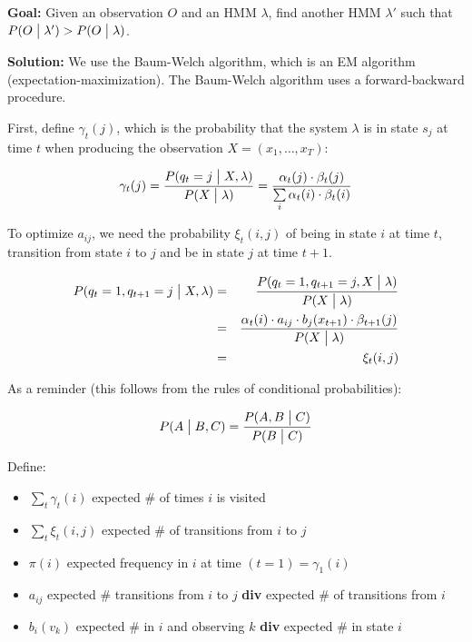 \documentclass[11pt]{article}
\begin{document}
\textbf{Goal:} Given an observation $O$ and an HMM $\lambda$, find another HMM $\lambda'$ such that $P(O \bigm| \lambda') > P(O \bigm| \lambda)$.

\textbf{Solution:} We use the Baum-Welch algorithm, which is an EM algorithm (expectation-maximization). The Baum-Welch algorithm uses a forward-backward procedure.

First, define $\gamma_t(j)$, which is the probability that the system $\lambda$ is in state $s_j$ at time $t$ when producing the observation $X = (x_1, \ldots, x_T)$:

\begin{equation}
    \gamma_t(j) = \frac{P(q_t = j \bigm| X, \lambda)}{P(X \bigm| \lambda)} = \frac{\alpha_t(j) \cdot \beta_t(j)}{\sum\limits_i \alpha_t(i) \cdot \beta_t(i)}
\end{equation}

To optimize $a_{ij}$, we need the probability $\xi_t(i, j)$ of being in state $i$ at time $t$, transition from state $i$ to $j$ and be in state $j$ at time $t+1$.

\begin{eqnarray*}
    P(q_t = 1, q_{t+1} = j \bigm| X, \lambda) &=& \frac{P(q_t = 1, q_{t+1} = j, X \bigm| \lambda)}{P(X \bigm| \lambda)} \\
                                              &=& \frac{\alpha_t(i) \cdot a_{ij} \cdot b_j(x_{t+1}) \cdot \beta_{t+1}(j)}{P(X \bigm| \lambda)} \\
                                              &=& \xi_t(i, j)
\end{eqnarray*}

As a reminder (this follows from the rules of conditional probabilities):

\begin{equation}
    P(A \bigm| B, C) = \frac{P(A, B \bigm| C)}{P(B \bigm| C)}
\end{equation}

Define:
\begin{itemize}
    \item $\sum\limits_t \gamma_t(i)$ expected \# of times $i$ is visited
    \item $\sum\limits_t \xi_t(i, j)$ expected \# of transitions from $i$ to $j$
    \item $\pi(i)$ expected frequency in $i$ at time $(t = 1) = \gamma_1(i)$
    \item $a_{ij}$ expected \# transitions from $i$ to $j$ \textbf{div} expected \# of transitions from $i$
    \item $b_i(v_k)$ expected \# in $i$ and observing $k$ \textbf{div} expected \# in state $i$
\end{itemize}
\end{document}
